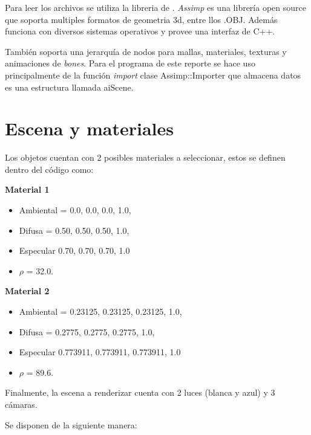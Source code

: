 \documentclass[12pt]{article}
\begin{document}
Para leer los archivos se utiliza la libreria de . 
\textit{Assimp} es una librería open source que soporta multiples formatos de geometria 3d, entre llos .OBJ. Además funciona con diversos sistemas operativos y provee una interfaz de C++.

También soporta una jerarquía de nodos para mallas, materiales, texturas y animaciones de \textit{bones}. Para el programa de este reporte se hace uso principalmente de la función \textit{import} clase Assimp::Importer que almacena datos es una estructura llamada aiScene.


\section{Escena y materiales}

Los objetos cuentan con 2 posibles materiales a seleccionar, estos se definen dentro del código como:

\textbf{Material 1}
\begin{itemize}
\item Ambiental = {0.0, 0.0, 0.0, 1.0},
\item Difusa = {0.50, 0.50, 0.50, 1.0},
\item Especular {0.70, 0.70, 0.70, 1.0} 
\item $\rho$ = 32.0.
\end{itemize}


\textbf{Material 2}
\begin{itemize}
\item Ambiental = {0.23125, 0.23125, 0.23125, 1.0},
\item Difusa = {0.2775, 0.2775, 0.2775, 1.0},
\item Especular {0.773911, 0.773911, 0.773911, 1.0}
\item $\rho$ = 89.6.
\end{itemize}


Finalmente, la escena a renderizar cuenta con 2 luces (blanca y azul) y 3 cámaras.

Se disponen de la siguiente manera: 
\end{document}
